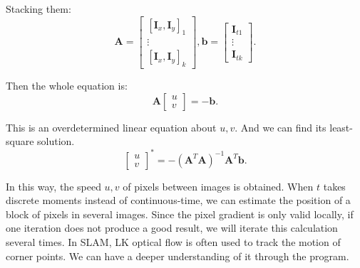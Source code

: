 Stacking them:
\begin{equation}
\mathbf{A} = \left[ {\begin{array}{*{20}{c}}
	{{{\left[ {{\mathbf{I}_x},{\mathbf{I}_y}} \right]}_1}}\\
	\vdots \\
	{{{\left[ {{\mathbf{I}_x},{\mathbf{I}_y}} \right]}_k}}
	\end{array}} \right],\mathbf{b} = \left[ {\begin{array}{*{20}{c}}
	{{ \mathbf{I}_{t1}}}\\
	\vdots \\
	{{ \mathbf{I}_{tk}}}
	\end{array}} \right].
\end{equation}

Then the whole equation is:
\begin{equation}
\mathbf{A}\left[ \begin{array}{l}
u\\
v
\end{array} \right] =  - \mathbf{b}.
\end{equation}

This is an overdetermined linear equation about $u,v$. And we can find its least-square solution.
\begin{equation}
{\left[ \begin{array}{l}
	u\\
	v
	\end{array} \right]^*} = -{\left( {{ \mathbf{A}^T}\mathbf{A}} \right)^{ - 1}}{ \mathbf{A}^T}\mathbf{b}.
\end{equation}

In this way, the speed $u,v$ of pixels between images is obtained. When $t$ takes discrete moments instead of continuous-time, we can estimate the position of a block of pixels in several images. Since the pixel gradient is only valid locally, if one iteration does not produce a good result, we will iterate this calculation several times. In SLAM, LK optical flow is often used to track the motion of corner points. We can have a deeper understanding of it through the program.

